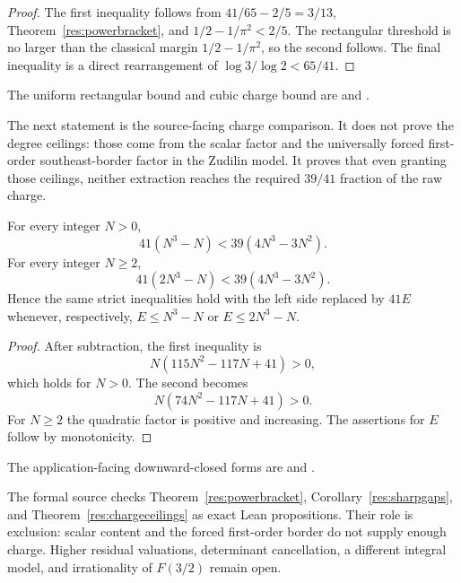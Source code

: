 \documentclass[11pt]{article}
\begin{document}
\begin{proof}
The first inequality follows from
$41/65-2/5=3/13$, Theorem~\ref{res:powerbracket}, and
$1/2-1/\pi^2<2/5$.  The rectangular threshold is no larger than the classical
margin $1/2-1/\pi^2$, so the second follows.  The final inequality is a direct
rearrangement of $\log3/\log2<65/41$.
\end{proof}

\noindent The uniform rectangular bound and cubic charge bound are
and
.

The next statement is the source-facing charge comparison.  It does not prove
the degree ceilings: those come from the scalar factor and the universally
forced first-order southeast-border factor in the Zudilin model.  It proves
that even granting those ceilings, neither extraction reaches the required
$39/41$ fraction of the raw charge.

\begin{theorem}\label{res:chargeceilings}
For every integer $N>0$,
\[
 41(N^3-N)<39(4N^3-3N^2).
\]
For every integer $N\ge2$,
\[
 41(2N^3-N)<39(4N^3-3N^2).
\]
Hence the same strict inequalities hold with the left side replaced by
$41E$ whenever, respectively, $E\le N^3-N$ or $E\le2N^3-N$.
\end{theorem}

\begin{proof}
After subtraction, the first inequality is
\[
 N(115N^2-117N+41)>0,
\]
which holds for $N>0$.  The second becomes
\[
 N(74N^2-117N+41)>0.
\]
For $N\ge2$ the quadratic factor is positive and increasing.  The assertions
for $E$ follow by monotonicity.
\end{proof}

\noindent The application-facing downward-closed forms are
and
.

The formal source checks Theorem~\ref{res:powerbracket},
Corollary~\ref{res:sharpgaps}, and Theorem~\ref{res:chargeceilings} as exact
Lean propositions.  Their role is exclusion: scalar content and the forced
first-order border do not supply enough charge.  Higher residual valuations,
determinant cancellation, a different integral model, and irrationality of
$F(3/2)$ remain open.
\end{document}
